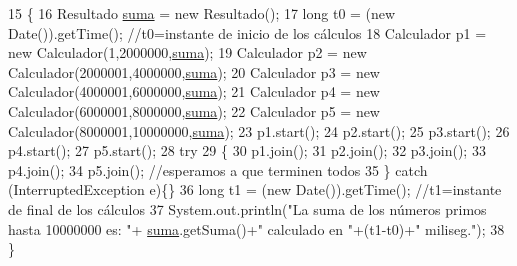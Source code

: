 \begin{DoxyCode}
15     \{      
16         Resultado \mbox{\hyperlink{namespacesuma}{suma}} = \textcolor{keyword}{new} Resultado();
17         \textcolor{keywordtype}{long} t0 = (\textcolor{keyword}{new} Date()).getTime(); \textcolor{comment}{//t0=instante de inicio de los cálculos}
18         Calculador p1 = \textcolor{keyword}{new} Calculador(1,2000000,\mbox{\hyperlink{namespacesuma}{suma}});
19         Calculador p2 = \textcolor{keyword}{new} Calculador(2000001,4000000,\mbox{\hyperlink{namespacesuma}{suma}});
20         Calculador p3 = \textcolor{keyword}{new} Calculador(4000001,6000000,\mbox{\hyperlink{namespacesuma}{suma}});
21         Calculador p4 = \textcolor{keyword}{new} Calculador(6000001,8000000,\mbox{\hyperlink{namespacesuma}{suma}});
22         Calculador p5 = \textcolor{keyword}{new} Calculador(8000001,10000000,\mbox{\hyperlink{namespacesuma}{suma}});
23         p1.start();
24         p2.start();
25         p3.start();
26         p4.start();
27         p5.start();
28         \textcolor{keywordflow}{try}
29         \{
30             p1.join();
31             p2.join();
32             p3.join();
33             p4.join();
34             p5.join(); \textcolor{comment}{//esperamos a que terminen todos}
35         \} \textcolor{keywordflow}{catch} (InterruptedException e)\{\}
36         \textcolor{keywordtype}{long} t1 = (\textcolor{keyword}{new} Date()).getTime(); \textcolor{comment}{//t1=instante de final de los cálculos}
37         System.out.println(\textcolor{stringliteral}{"La suma de los números primos hasta 10000000 es: "}+
      \mbox{\hyperlink{namespacesuma}{suma}}.getSuma()+\textcolor{stringliteral}{" calculado en "}+(t1-t0)+\textcolor{stringliteral}{" miliseg."});
38     \}
\end{DoxyCode}
